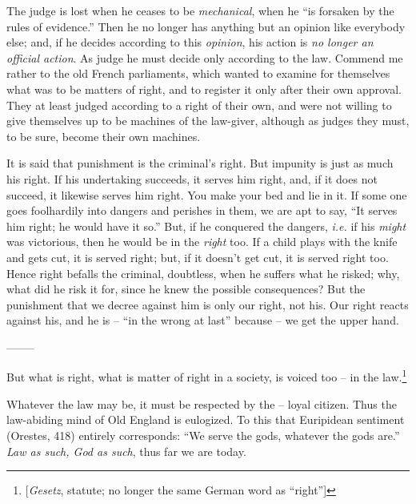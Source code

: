 \documentclass[12pt,a4paper]{book}
\begin{document}
The judge is lost when he ceases to be \textit{mechanical}, when he ``is 
forsaken by the rules of evidence.'' Then he no longer has anything but an 
opinion like everybody else; and, if he decides according to this 
\textit{opinion}, his action is \textit{no longer an official action}. As 
judge he must decide only according to the law. Commend me rather to the old 
French parliaments, which wanted to examine for themselves what was to be 
matters of right, and to register it only after their own approval. They at 
least judged according to a right of their own, and were not willing to give 
themselves up to be machines of the law-giver, although as judges they must, 
to be sure, become their own machines.

It is said that punishment is the criminal's right. But impunity is just as 
much his right. If his undertaking succeeds, it serves him right, and, if it 
does not succeed, it likewise serves him right. You make your bed and lie in 
it. If some one goes foolhardily into dangers and perishes in them, we are apt 
to say, ``It serves him right; he would have it so.'' But, if he conquered 
the dangers, \textit{i.e.} if his \textit{might} was victorious, then he would 
be in the \textit{right} too. If a child plays with the knife and gets cut, it 
is served right; but, if it doesn't get cut, it is served right too. Hence 
right befalls the criminal, doubtless, when he suffers what he risked; why, 
what did he risk it for, since he knew the possible consequences? But the 
punishment that we decree against him is only our right, not his. Our right 
reacts against his, and he is -- ``in the wrong at last'' because -- we get 
the upper hand.

\begin{center}
--------\end{center}


But what is right, what is matter of right in a society, is voiced too -- in 
the law.\footnote{[\textit{Gesetz}, statute; no longer the same German word as 
``right'']}

Whatever the law may be, it must be respected by the -- loyal citizen. Thus 
the law-abiding mind of Old England is eulogized. To this that Euripidean 
sentiment (Orestes, 418) entirely corresponds: ``We serve the gods, whatever 
the gods are.'' \textit{Law as such, God as such}, thus far we are today.
\end{document}
